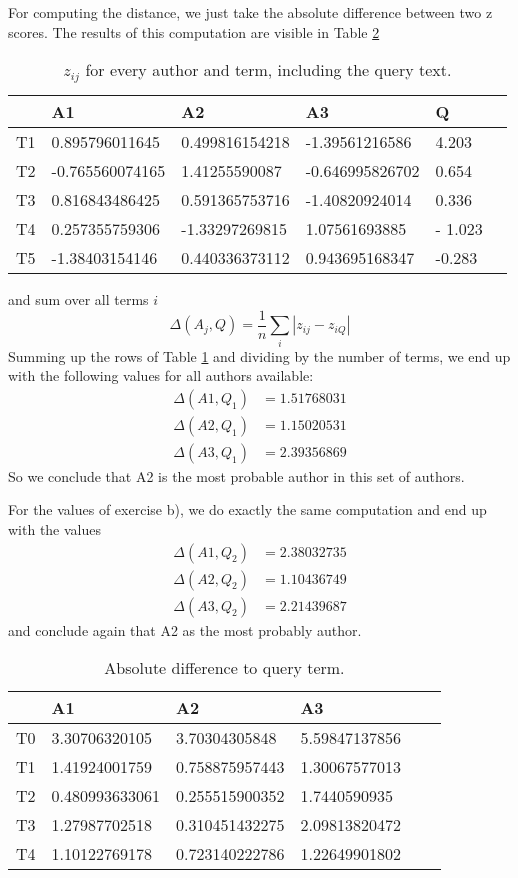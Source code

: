 \documentclass[11pt]{article}
\begin{document}
For computing the distance, we just take the
absolute difference between two z scores. The results of this computation are visible in Table \ref{table:abs_diff}
\begin{table}[h]
\center
\begin{tabular}{|l|l|l|l|l|l|}
\hline
	 & A1 & A2 & A3 & Q \\
	 \hline
T1 & 0.895796011645 & 0.499816154218 & -1.39561216586 & 4.203 \\
 \hline 
T2 & -0.765560074165 & 1.41255590087 & -0.646995826702 & 0.654\\
 \hline 
T3 & 0.816843486425 & 0.591365753716 & -1.40820924014 & 0.336\\
 \hline 
T4 & 0.257355759306 & -1.33297269815 & 1.07561693885 & - 1.023\\
 \hline 
T5 & -1.38403154146 & 0.440336373112 & 0.943695168347 & -0.283 \\
\hline
\end{tabular}
\caption{$z_{ij}$ for every author and term, including the query text. }
\label{table:zscores}
\end{table}
and sum over all terms $i$
\begin{equation}
	\Delta(A_j, Q) = \frac{1}{n} \sum_i | z_{ij} - z_{iQ} |
\end{equation}
Summing up the rows of Table \ref{table:zscores} and dividing by the number
of terms, we end up with the following values for all authors available:
\begin{align*}
	 \Delta(A1, Q_1) &= 1.51768031 \\
	 \Delta(A2, Q_1) &= 1.15020531 \\
	 \Delta(A3, Q_1) &= 2.39356869
\end{align*}
So we conclude that A2 is the most probable author in this set of authors.

For the values of exercise b), we do exactly the same computation and end up with the values
\begin{align*}
	 \Delta(A1, Q_2) &= 2.38032735 \\
	 \Delta(A2, Q_2) &= 1.10436749 \\
	 \Delta(A3, Q_2) &= 2.21439687
\end{align*}
and conclude again that A2 as the most probably author.
\begin{table}
\center
\begin{tabular}{|l|l|l|l|l|l|}
\hline
	 & A1 & A2 & A3 \\
	 \hline
T0 & 3.30706320105 & 3.70304305848 & 5.59847137856 \\
 \hline 
T1 & 1.41924001759 & 0.758875957443 & 1.30067577013 \\
 \hline 	
T2 & 0.480993633061 & 0.255515900352 & 1.7440590935 \\
 \hline 
T3 & 1.27987702518 & 0.310451432275 & 2.09813820472 \\
 \hline 
T4 & 1.10122769178 & 0.723140222786 & 1.22649901802 \\
 \hline
\end{tabular}
\caption{Absolute difference to query term.}
\label{table:abs_diff}
\end{table}
\end{document}
